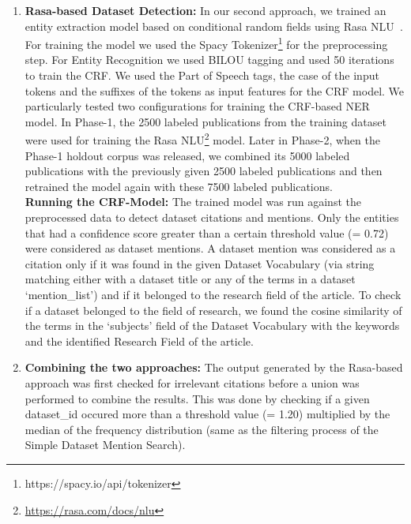 \documentclass[runningheads]{llncs}
\begin{document}
\begin{enumerate}
		\item \textbf{Rasa-based Dataset Detection:}
		In our second approach, we trained an entity extraction model based on conditional random fields using Rasa NLU~\cite{DBLP:journals/corr/abs-1712-05181}. For training the model we used the Spacy Tokenizer\footnote{https://spacy.io/api/tokenizer} for the preprocessing step. For Entity Recognition we used BILOU tagging and used 50 iterations to train the CRF. We used the Part of Speech tags, the case of the input tokens and the suffixes of the tokens as input features for the CRF model. 
		We particularly tested two configurations for training the CRF-based NER model. In Phase-1, the 2500 labeled publications from the training dataset were used for training the Rasa NLU\footnote{\url{https://rasa.com/docs/nlu}} model. Later in Phase-2, when the Phase-1 holdout corpus was released, we combined its 5000 labeled publications with the previously given 2500 labeled publications and then retrained the model again with these 7500 labeled publications. %
		\\
		\textbf{Running the CRF-Model:} The trained model was run against the preprocessed data to detect dataset citations and mentions. Only the entities that had a confidence score greater than a certain threshold value (= 0.72) were considered as dataset mentions. A dataset mention was considered as a citation only if it was found in the given Dataset Vocabulary (via string matching either with a dataset title or any of the terms in a dataset `mention\_list') and if it belonged to the research field of the article. %
		To check if a dataset belonged to the field of research, we found the cosine similarity of the terms in the ‘subjects’ field of the Dataset Vocabulary with the keywords and the identified Research Field of the article. 
		\smallskip
		\item \textbf{Combining the two approaches:}
		The output generated by the Rasa-based approach was first checked for irrelevant citations before a union was performed to combine the results. 
		This was done by checking if a given dataset\_id occured more than a threshold value (= 1.20) multiplied by the median of the frequency distribution (same as the filtering process of the Simple Dataset Mention Search). %
	\end{enumerate} 
	
\end{document}
